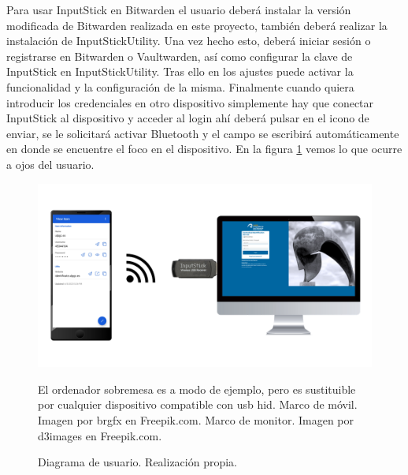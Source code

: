 Para usar InputStick en Bitwarden el usuario deberá instalar la versión modificada de Bitwarden realizada en este proyecto, también deberá realizar la instalación de InputStickUtility. Una vez hecho esto, deberá iniciar sesión o registrarse en Bitwarden o Vaultwarden, así como configurar la clave de InputStick en InputStickUtility. Tras ello en los ajustes puede activar la funcionalidad y la configuración de la misma. Finalmente cuando quiera introducir los credenciales en otro dispositivo simplemente hay que conectar InputStick al dispositivo y acceder al \gls{login} ahí deberá pulsar en el icono de enviar, se le solicitará activar Bluetooth y el campo se escribirá automáticamente en donde se encuentre el foco en el dispositivo. En la figura \ref{fig:diagrama_de_usuario} vemos lo que ocurre a ojos del usuario.

\begin{figure}[H]
    \centering
    \includegraphics[width=\textwidth]{gfx/diagrama_de_usuario.png}
    \caption{Diagrama de usuario. Realización propia.}
    \label{fig:diagrama_de_usuario}
    El ordenador sobremesa es a modo de ejemplo, pero es sustituible por cualquier dispositivo compatible con \gls{usb} \gls{hid}.\newline
    Marco de móvil. Imagen por brgfx en Freepik.com.\newline
    Marco de monitor. Imagen por d3images en Freepik.com.\newline
\end{figure}